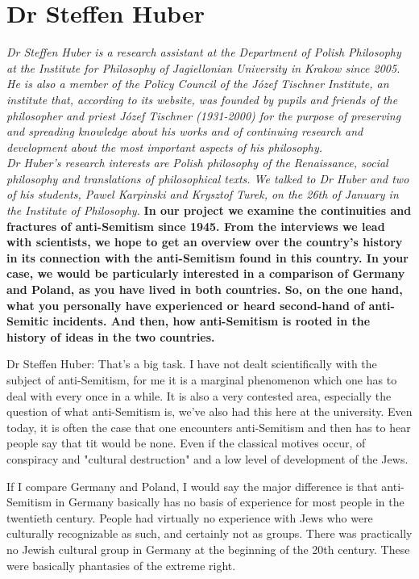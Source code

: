\section{Dr Steffen Huber}

\textit{Dr Steffen Huber is a research assistant at the Department of Polish Philosophy at the Institute for Philosophy of Jagiellonian University in Krakow since 2005. He is also a member of the Policy Council of the Józef Tischner Institute, an institute that, according to its website, was founded by pupils and friends of the philosopher and priest Józef Tischner (1931-2000) for the purpose of preserving and spreading knowledge about his works and of continuing research and development about the most important aspects of his philosophy.\\ 
Dr Huber’s research interests are Polish philosophy of the Renaissance, social philosophy and translations of philosophical texts. We talked to Dr Huber and two of his students, Pawel Karpinski and Krysztof Turek, on the 26th of January in the Institute of Philosophy.}
\vspace*{2em}
\textbf{In our project we examine the continuities and fractures of anti-Semitism since 1945. From the interviews we lead with scientists, we hope to get an overview over the country's history in its connection with the anti-Semitism found in this country. In your case, we would be particularly interested in a comparison of Germany and Poland, as you have lived in both countries. So, on the one hand, what you personally have experienced or heard second-hand of anti-Semitic incidents. And then, how anti-Semitism is rooted in the history of ideas in the two countries.} 

 

Dr Steffen Huber: That's a big task. I have not dealt scientifically with the subject of anti-Semitism, for me it is a marginal phenomenon which one has to deal with every once in a while. It is also a very contested area, especially the question of what anti-Semitism is, we’ve also had this here at the university. Even today, it is often the case that one encounters anti-Semitism and then has to hear people say that tit would be none. Even if the classical motives occur, of conspiracy and "cultural destruction" and a low level of development of the Jews.  

If I compare Germany and Poland, I would say the major difference is that anti-Semitism in Germany basically has no basis of experience for most people in the twentieth century. People had virtually no experience with Jews who were culturally recognizable as such, and certainly not as groups. There was practically no Jewish cultural group in Germany at the beginning of the 20th century. These were basically phantasies of the extreme right. 

